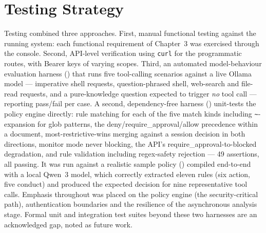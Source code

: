 \documentclass[12pt,a4paper,oneside]{report}
\begin{document}
\section{Testing Strategy}
Testing combined three approaches. First, manual functional testing
against the running system: each functional requirement of Chapter~3
was exercised through the console. Second, API-level verification
using \texttt{curl} for the programmatic routes, with Bearer keys of
varying scopes. Third, an automated model-behaviour evaluation
harness () that runs five
tool-calling scenarios against a live Ollama model --- imperative
shell requests, question-phrased shell, web-search and file-read
requests, and a pure-knowledge question expected to trigger \emph{no}
tool call --- reporting pass/fail per case. A second, dependency-free
harness () unit-tests the
policy engine directly: rule matching for each of the five match
kinds including \texttt{\textasciitilde}-expansion for glob patterns,
the deny/require\_approval/allow precedence within a document,
most-restrictive-wins merging against a session decision in both
directions, monitor mode never blocking, the API's
require\_approval-to-blocked degradation, and rule validation
including regex-safety rejection --- 49 assertions, all passing. It
was run against a realistic sample policy
() compiled end-to-end with a
local Qwen~3 model, which correctly extracted eleven rules (six
action, five conduct) and produced the expected decision for nine
representative tool calls. Emphasis throughout was
placed on the policy engine (the security-critical path),
authentication boundaries and the resilience of the asynchronous
analysis stage. Formal unit and integration test suites beyond these
two harnesses are an acknowledged gap, noted as future work.
\end{document}
